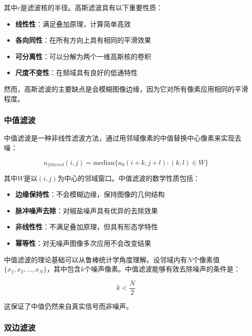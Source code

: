 \documentclass[a4paper,12pt]{ctexart}
\begin{document}
其中$r$是滤波核的半径。高斯滤波具有以下重要性质：

\begin{itemize}
    \item \textbf{线性性}：满足叠加原理，计算简单高效
    \item \textbf{各向同性}：在所有方向上具有相同的平滑效果
    \item \textbf{可分离性}：可以分解为两个一维高斯核的卷积
    \item \textbf{尺度不变性}：在频域具有良好的低通特性
\end{itemize}

然而，高斯滤波的主要缺点是会模糊图像边缘，因为它对所有像素应用相同的平滑程度。

\subsubsection{中值滤波}

中值滤波是一种非线性滤波方法，通过用邻域像素的中值替换中心像素来实现去噪：

\begin{equation}
u_{filtered}(i,j) = \text{median}\{u_0(i+k,j+l) : (k,l) \in W\}
\end{equation}

其中$W$是以$(i,j)$为中心的邻域窗口。中值滤波的数学性质包括：

\begin{itemize}
    \item \textbf{边缘保持性}：不会模糊边缘，保持图像的几何结构
    \item \textbf{脉冲噪声去除}：对椒盐噪声具有优异的去除效果
    \item \textbf{非线性性}：不满足叠加原理，但具有形态学特性
    \item \textbf{幂等性}：对无噪声图像多次应用不会改变结果
\end{itemize}

中值滤波的理论基础可以从鲁棒统计学角度理解。设邻域内有$N$个像素值$\{x_1, x_2, \ldots, x_N\}$，其中包含$k$个噪声像素。中值滤波能够有效去除噪声的条件是：

\begin{equation}
k < \frac{N}{2}
\end{equation}

这保证了中值仍然来自真实信号而非噪声。

\subsubsection{双边滤波}
\end{document}
